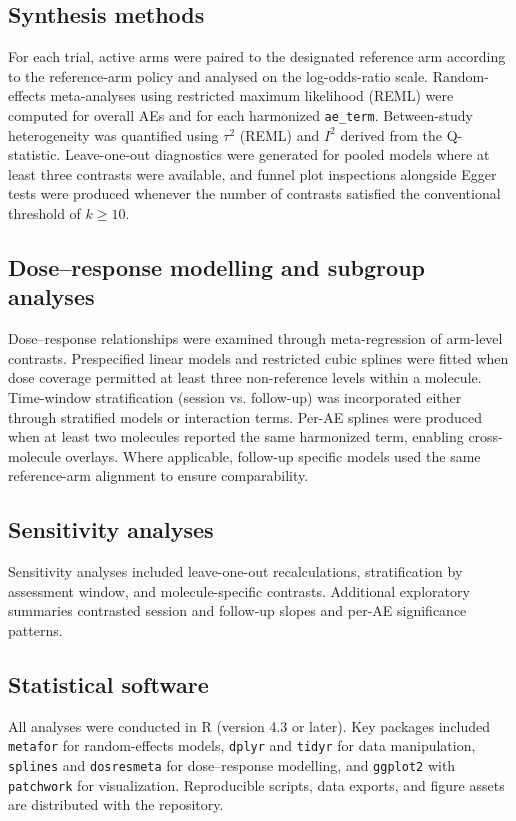 \subsection{Synthesis methods}
For each trial, active arms were paired to the designated reference arm according to the reference-arm policy and analysed on the log-odds-ratio scale. Random-effects meta-analyses using restricted maximum likelihood (REML) were computed for overall AEs and for each harmonized \texttt{ae\_term}. Between-study heterogeneity was quantified using $\tau^2$ (REML) and $I^2$ derived from the Q-statistic. Leave-one-out diagnostics were generated for pooled models where at least three contrasts were available, and funnel plot inspections alongside Egger tests were produced whenever the number of contrasts satisfied the conventional threshold of $k\geq10$.

\subsection{Dose--response modelling and subgroup analyses}
Dose--response relationships were examined through meta-regression of arm-level contrasts. Prespecified linear models and restricted cubic splines were fitted when dose coverage permitted at least three non-reference levels within a molecule. Time-window stratification (session vs. follow-up) was incorporated either through stratified models or interaction terms. Per-AE splines were produced when at least two molecules reported the same harmonized term, enabling cross-molecule overlays. Where applicable, follow-up specific models used the same reference-arm alignment to ensure comparability.

\subsection{Sensitivity analyses}
Sensitivity analyses included leave-one-out recalculations, stratification by assessment window, and molecule-specific contrasts. Additional exploratory summaries contrasted session and follow-up slopes and per-AE significance patterns.

\subsection{Statistical software}
All analyses were conducted in R (version 4.3 or later). Key packages included \texttt{metafor} for random-effects models, \texttt{dplyr} and \texttt{tidyr} for data manipulation, \texttt{splines} and \texttt{dosresmeta} for dose--response modelling, and \texttt{ggplot2} with \texttt{patchwork} for visualization. Reproducible scripts, data exports, and figure assets are distributed with the repository.


